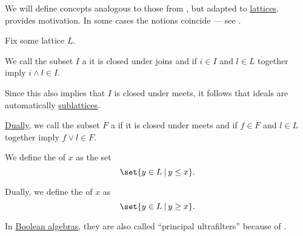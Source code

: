 \begin{definition}\label{def:lattice_ideal}
  We will define concepts analogous to those from , but adapted to \hyperref[def:semilattice/lattice]{lattices}.  provides motivation. In some cases the notions coincide --- see .

  Fix some lattice \( L \).

  \begin{thmenum}
    \begin{minipage}[t]{0.45\textwidth}
      We call the subset \( I \) a  it is closed under joins and if \( i \in I \) and \( l \in L \) together imply \( i \wedge l \in I \).

      Since this also implies that \( I \) is closed under meets, it follows that ideals are automatically \hyperref[def:semilattice/submodel]{sublattices}.
    \end{minipage}
    \hspace{0.02\textwidth}
    \begin{minipage}[t]{0.45\textwidth}
      \hyperref[def:partially_ordered_set/duality]{Dually}, we call the subset \( F \) a  if it is closed under meets and if \( f \in F \) and \( l \in L \) together imply \( f \vee l \in F \).
    \end{minipage}

    \begin{minipage}[t]{0.45\textwidth}
      We define the  of \( x \) as the set
      \begin{equation*}
        \set{ y \in L \given y \leq x }.
      \end{equation*}
    \end{minipage}
    \hspace{0.02\textwidth}
    \begin{minipage}[t]{0.45\textwidth}
      Dually, we define the  of \( x \) as
      \begin{equation*}
        \set{ y \in L \given y \geq x }.
      \end{equation*}

      In \hyperref[def:boolean_algebra]{Boolean algebras}, they are also called \enquote{principal ultrafilters} because of .
    \end{minipage}


\end{thmenum}
\end{definition}
